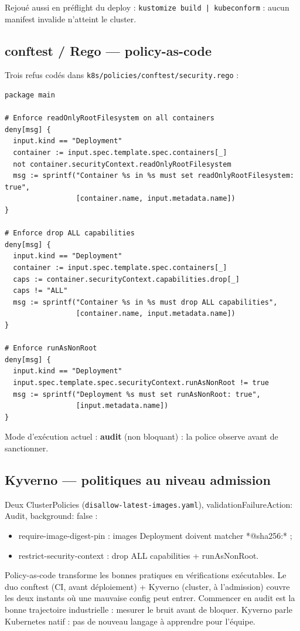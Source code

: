 \documentclass[12pt,a4paper,twoside,openright]{report}
\begin{document}
Rejoué aussi en préflight du deploy : \texttt{kustomize build | kubeconform} : aucun manifest invalide n'atteint le cluster.

\subsection{conftest / Rego --- policy-as-code}
Trois refus codés dans \texttt{k8s/policies/conftest/security.rego} :

\begin{lstlisting}[caption={security.rego : intégralité}]
package main

# Enforce readOnlyRootFilesystem on all containers
deny[msg] {
  input.kind == "Deployment"
  container := input.spec.template.spec.containers[_]
  not container.securityContext.readOnlyRootFilesystem
  msg := sprintf("Container %s in %s must set readOnlyRootFilesystem: true",
                 [container.name, input.metadata.name])
}

# Enforce drop ALL capabilities
deny[msg] {
  input.kind == "Deployment"
  container := input.spec.template.spec.containers[_]
  caps := container.securityContext.capabilities.drop[_]
  caps != "ALL"
  msg := sprintf("Container %s in %s must drop ALL capabilities",
                 [container.name, input.metadata.name])
}

# Enforce runAsNonRoot
deny[msg] {
  input.kind == "Deployment"
  input.spec.template.spec.securityContext.runAsNonRoot != true
  msg := sprintf("Deployment %s must set runAsNonRoot: true",
                 [input.metadata.name])
}
\end{lstlisting}

Mode d'exécution actuel : \textbf{audit} (non bloquant) : la police observe avant de sanctionner.

\subsection{Kyverno --- politiques au niveau admission}
Deux ClusterPolicies (\texttt{disallow-latest-images.yaml}), validationFailureAction: Audit, background: false :
\begin{itemize}[itemsep=1pt]
  \item require-image-digest-pin : images Deployment doivent matcher *@sha256:* ;
  \item restrict-security-context : drop ALL capabilities + runAsNonRoot.
\end{itemize}

\begin{whybox}
Policy-as-code transforme les bonnes pratiques en vérifications exécutables. Le duo conftest (CI, avant déploiement) + Kyverno (cluster, à l'admission) couvre les deux instants où une mauvaise config peut entrer. Commencer en audit est la bonne trajectoire industrielle : mesurer le bruit avant de bloquer. Kyverno parle Kubernetes natif : pas de nouveau langage à apprendre pour l'équipe.
\end{whybox}
\end{document}
